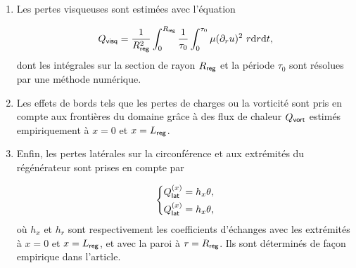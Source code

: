 \begin{enumerate}[label=\textbf{(\roman*)}]
%
%

\item Les pertes visqueuses sont estimées avec l'équation

\begin{equation}
Q_{\sf visq} = \frac{1}{R_{\sf reg}^2} \int_{0}^{R_{\sf reg}} \frac{1}{\tau_0} \int_0^{\tau_0} \mu (\partial_r u)^2\ r \mathrm{d} r \mathrm{d} t,
\label{eq:FluxVisq_Lotton}
\end{equation}
dont les intégrales sur la section de rayon $R_{\sf reg}$ et la période $\tau_0$ sont résolues par une méthode numérique.

\item Les effets de bords tels que les pertes de charges ou la vorticité sont pris en compte aux frontières du domaine grâce à des flux de chaleur $Q_{\sf vort}$ estimés empiriquement à $x=0$ et $x=L_{\sf reg}$.

\item Enfin, les pertes latérales sur la circonférence et aux extrémités du régénérateur sont prises en compte par

\begin{equation}
	\left\{ \begin{aligned}
		Q_{\sf lat}^{(x)} &= h_x \theta,\\
		Q_{\sf lat}^{(x)} &= h_x \theta,
	\end{aligned}\right.
\label{eq:FluxLat_Lotton}
\end{equation}
où $h_x$ et $h_r$ sont respectivement les coefficients d'échanges avec les extrémités à $x=0$ et $x=L_{\sf reg}$, et avec la paroi à $r = R_{\sf reg}$. Ils sont déterminés de façon empirique dans l'article.

%
%


\end{enumerate}
